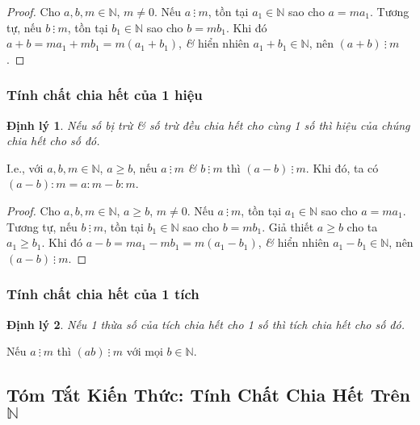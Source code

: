 \documentclass[oneside]{book}
\numberwithin{equation}{section}
\newtheorem{dinhly}{Định lý}[section]
\begin{document}
\begin{proof}[Proof]
	Cho $a,b,m\in\mathbb{N}$, $m\ne 0$. Nếu $a\ \vdots\ m$, tồn tại $a_1\in\mathbb{N}$ sao cho $a = ma_1$. Tương tự, nếu $b\ \vdots\ m$, tồn tại $b_1\in\mathbb{N}$ sao cho $b = mb_1$. Khi đó $a + b = ma_1 + mb_1 = m(a_1 + b_1)$, \textit{\&} hiển nhiên $a_1 + b_1\in\mathbb{N}$, nên $(a + b)\ \vdots\ m$.
\end{proof}

\subsubsection{Tính chất chia hết của 1 hiệu}
\begin{dinhly}
	Nếu số bị trừ \textit{\&} số trừ đều chia hết cho cùng 1 số thì hiệu của chúng chia hết cho số đó.
\end{dinhly}
I.e., với $a,b,m\in\mathbb{N}$, $a\ge b$, nếu $a\ \vdots\ m$ \textit{\&} $b\ \vdots\ m$ thì $(a - b)\ \vdots\ m$. Khi đó, ta có $(a - b):m = a:m - b:m$.

\begin{proof}[Proof]
	Cho $a,b,m\in\mathbb{N}$, $a\ge b$, $m\ne 0$. Nếu $a\ \vdots\ m$, tồn tại $a_1\in\mathbb{N}$ sao cho $a = ma_1$. Tương tự, nếu $b\ \vdots\ m$, tồn tại $b_1\in\mathbb{N}$ sao cho $b = mb_1$. Giả thiết $a\ge b$ cho ta $a_1\ge b_1$. Khi đó $a - b = ma_1 - mb_1 = m(a_1 - b_1)$, \textit{\&} hiển nhiên $a_1 - b_1\in\mathbb{N}$, nên $(a - b)\ \vdots\ m$.
\end{proof}

\subsubsection{Tính chất chia hết của 1 tích}
\begin{dinhly}
	Nếu 1 thừa số của tích chia hết cho 1 số thì tích chia hết cho số đó.
\end{dinhly}
Nếu $a\ \vdots\ m$  thì $(ab)\ \vdots\ m$ với mọi $b\in\mathbb{N}$.

\subsection{Tóm Tắt Kiến Thức: Tính Chất Chia Hết Trên $\mathbb{N}$}
\end{document}
